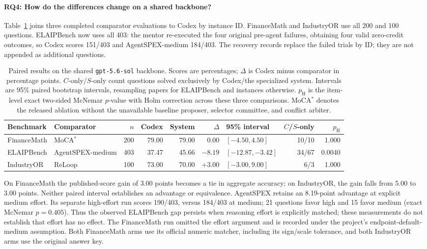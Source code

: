 \paragraph{RQ4: How do the differences change on a shared backbone?}
\label{sec:likeforlike}
Table~\ref{tab:l4l} joins three completed comparator evaluations to Codex by instance ID.
FinanceMath and IndustryOR use all 200 and 100 questions. ELAIPBench now uses all 403:
the mentor re-executed the four original pre-agent failures, obtaining four valid zero-credit
outcomes, so Codex scores 151/403 and AgentSPEX-medium 184/403. The recovery records replace
the failed trials by ID; they are not appended as additional questions.

\begin{table}[t]
\caption{Paired results on the shared \texttt{gpt-5.6-sol} backbone. Scores are percentages;
$\Delta$ is Codex minus comparator in percentage points. $C$-only/$S$-only count questions
solved exclusively by Codex/the specialized system. Intervals are 95\% paired bootstrap
intervals, resampling papers for ELAIPBench and instances otherwise. $p_{\mathrm H}$ is the
item-level exact two-sided McNemar $p$-value with Holm correction across these three comparisons.
MoCA$^*$ denotes the released ablation without the unavailable baseline proposer, selector
committee, and conflict arbiter.}
\label{tab:l4l}
\centering
\scriptsize
\setlength{\tabcolsep}{3.2pt}
\begin{tabular}{@{}llrrrrlrr@{}}
\toprule
Benchmark & Comparator & $n$ & Codex & System & $\Delta$ & 95\% interval & $C$/$S$-only & $p_{\mathrm H}$ \\
\midrule
FinanceMath & MoCA$^*$ & 200 & 79.00 & 79.00 & $0.00$ & $[-4.50,4.50]$ & 10/10 & 1.000 \\
ELAIPBench & AgentSPEX-medium & 403 & 37.47 & 45.66 & $-8.19$ & $[-12.87,-3.42]$ & 34/67 & 0.0040 \\
IndustryOR & ReLoop & 100 & 73.00 & 70.00 & $+3.00$ & $[-3.00,9.00]$ & 6/3 & 1.000 \\
\bottomrule
\end{tabular}
\end{table}

On FinanceMath the published-score gain of 3.00 points becomes a tie in aggregate accuracy;
on IndustryOR, the gain falls from 5.00 to 3.00 points. Neither paired interval establishes
an advantage or equivalence. AgentSPEX retains an 8.19-point advantage at explicit medium effort.
Its separate high-effort run scores 190/403, versus 184/403 at medium; 21 questions favor high
and 15 favor medium (exact McNemar $p=0.405$). Thus the observed ELAIPBench gap persists when
reasoning effort is explicitly matched; these measurements do not establish that effort has
no effect. The FinanceMath run omitted the effort argument and is recorded under the project's
endpoint-default-medium assumption. Both FinanceMath arms use its official numeric matcher,
including its sign/scale tolerance, and both IndustryOR arms use the original answer key.

